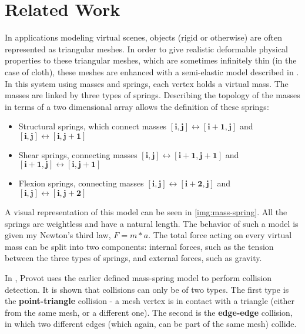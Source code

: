 \chapter{Related Work}
\label{chapter:sota}



In applications modeling virtual scenes, objects (rigid or otherwise) are often represented as triangular meshes. In order to give realistic deformable physical properties to these triangular meshes, which are sometimes infinitely thin (in the case of cloth), these meshes are enhanced with a semi-elastic model described in \citep{provot95}. In this system using masses and springs, each vertex holds a virtual mass. The masses are linked by three types of springs. Describing the topology of the masses in terms of a two dimensional array allows the definition of these springs:

\begin{itemize}
	\item Structural springs, which connect masses $\mathbf{[i, j] \leftrightarrow [i + 1, j]}$ and $\mathbf{[i, j] \leftrightarrow [i,j + 1]}$
	\item Shear springs, connecting masses $\mathbf{[i, j] \leftrightarrow [i + 1, j + 1]}$ and $\mathbf{[i + 1, j] \leftrightarrow [i, j + 1]}$
	\item Flexion springs, connecting masses $\mathbf{[i, j] \leftrightarrow [i + 2, j]}$ and $\mathbf{[i, j] \leftrightarrow [i, j + 2]}$
\end{itemize}

A visual representation of this model can be seen in \autoref{img:mass-spring}. All the springs are weightless and have a natural length. The behavior of such a model is given my Newton's third law, $F = m * a$. The total force acting on every virtual mass can be split into two components: internal forces, such as the tension between the three types of springs, and external forces, such as gravity.

In \citep{provot97}, Provot uses the earlier defined mass-spring model \citep{provot95} to perform collision detection. It is shown that collisions can only be of two types. The first type is the \textbf{point-triangle} collision - a mesh vertex is in contact with a triangle (either from the same mesh, or a different one). The second is the \textbf{edge-edge} collision, in which two different edges (which again, can be part of the same mesh) collide.

